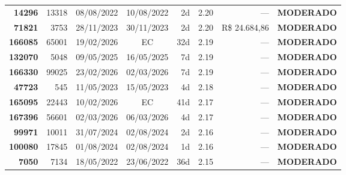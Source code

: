 \documentclass[a4paper,10pt]{article}
\begin{document}
\begin{center}
\begin{longtable}{>{\scriptsize}r>{\scriptsize}r>{\scriptsize}c>{\scriptsize}c>{\scriptsize}r>{\scriptsize}r>{\scriptsize}r>{\scriptsize}l}
\textcolor{anomyellow}{\textbf{14296}} & 13318 & 08/08/2022 & 10/08/2022 & 2d & \textcolor{anomyellow}{2.20} & --- & \textcolor{anomyellow}{\textbf{MODERADO}} \\

\textcolor{anomyellow}{\textbf{71821}} & 3753 & 28/11/2023 & 30/11/2023 & 2d & \textcolor{anomyellow}{2.20} & R\$ 24.684,86 & \textcolor{anomyellow}{\textbf{MODERADO}} \\

\textcolor{anomyellow}{\textbf{166085}} & 65001 & 19/02/2026 & \textcolor{anomorange}{EC} & 32d & \textcolor{anomyellow}{2.19} & --- & \textcolor{anomyellow}{\textbf{MODERADO}} \\

\textcolor{anomyellow}{\textbf{132070}} & 5048 & 09/05/2025 & 16/05/2025 & 7d & \textcolor{anomyellow}{2.19} & --- & \textcolor{anomyellow}{\textbf{MODERADO}} \\

\textcolor{anomyellow}{\textbf{166330}} & 99025 & 23/02/2026 & 02/03/2026 & 7d & \textcolor{anomyellow}{2.19} & --- & \textcolor{anomyellow}{\textbf{MODERADO}} \\

\textcolor{anomyellow}{\textbf{47723}} & 545 & 11/05/2023 & 15/05/2023 & 4d & \textcolor{anomyellow}{2.18} & --- & \textcolor{anomyellow}{\textbf{MODERADO}} \\

\textcolor{anomyellow}{\textbf{165095}} & 22443 & 10/02/2026 & \textcolor{anomorange}{EC} & 41d & \textcolor{anomyellow}{2.17} & --- & \textcolor{anomyellow}{\textbf{MODERADO}} \\

\textcolor{anomyellow}{\textbf{167396}} & 56601 & 02/03/2026 & 06/03/2026 & 4d & \textcolor{anomyellow}{2.17} & --- & \textcolor{anomyellow}{\textbf{MODERADO}} \\

\textcolor{anomyellow}{\textbf{99971}} & 10011 & 31/07/2024 & 02/08/2024 & 2d & \textcolor{anomyellow}{2.16} & --- & \textcolor{anomyellow}{\textbf{MODERADO}} \\

\textcolor{anomyellow}{\textbf{100080}} & 17845 & 01/08/2024 & 02/08/2024 & 1d & \textcolor{anomyellow}{2.16} & --- & \textcolor{anomyellow}{\textbf{MODERADO}} \\

\textcolor{anomyellow}{\textbf{7050}} & 7134 & 18/05/2022 & 23/06/2022 & 36d & \textcolor{anomyellow}{2.15} & --- & \textcolor{anomyellow}{\textbf{MODERADO}} \\


\end{longtable}
\end{center}
\end{document}
